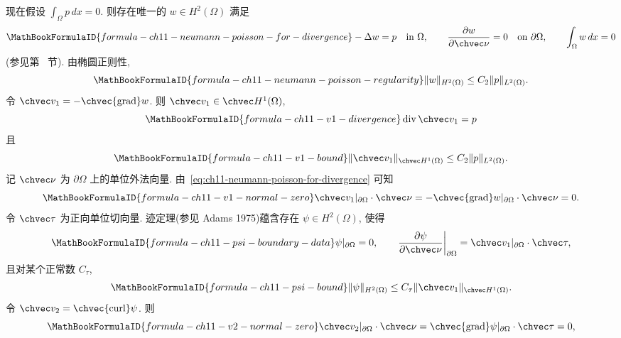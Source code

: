 \begin{Proof}
现在假设 $\int_\Omega p\,dx=0$. 则存在唯一的 $w\in H^2(\Omega)$ 满足
\begin{equation}
\MathBookFormulaID{formula-ch11-neumann-poisson-for-divergence}
\label{eq:ch11-neumann-poisson-for-divergence}
-\Delta w=p\quad\text{in }\Omega,
\qquad
\frac{\partial w}{\partial\chvec\nu}=0\quad\text{on }\partial\Omega,
\qquad
\int_\Omega w\,dx=0
\end{equation}
(参见第~ 节). 由椭圆正则性,
\[
\MathBookFormulaID{formula-ch11-neumann-poisson-regularity}
\|w\|_{H^2(\Omega)}\leq C_2\|p\|_{L^2(\Omega)}.
\]
令 $\chvec v_1=-\chvec{\operatorname{grad}}w$. 则 $\chvec v_1\in\chvec H^1(\Omega)$,
\begin{equation}
\MathBookFormulaID{formula-ch11-v1-divergence}
\label{eq:ch11-v1-divergence}
\operatorname{div}\chvec v_1=p
\end{equation}
且
\begin{equation}
\MathBookFormulaID{formula-ch11-v1-bound}
\label{eq:ch11-v1-bound}
\|\chvec v_1\|_{\chvec H^1(\Omega)}\leq C_2\|p\|_{L^2(\Omega)}.
\end{equation}
记 $\chvec\nu$ 为 $\partial\Omega$ 上的单位外法向量. 由~\eqref{eq:ch11-neumann-poisson-for-divergence} 可知
\begin{equation}
\MathBookFormulaID{formula-ch11-v1-normal-zero}
\label{eq:ch11-v1-normal-zero}
\chvec v_1|_{\partial\Omega}\cdot\chvec\nu
=-\chvec{\operatorname{grad}}w|_{\partial\Omega}\cdot\chvec\nu=0.
\end{equation}
令 $\chvec\tau$ 为正向单位切向量. 迹定理(参见 Adams 1975)蕴含存在 $\psi\in H^2(\Omega)$, 使得
\[
\MathBookFormulaID{formula-ch11-psi-boundary-data}
\psi|_{\partial\Omega}=0,
\qquad
\frac{\partial\psi}{\partial\chvec\nu}\bigg|_{\partial\Omega}
=\chvec v_1|_{\partial\Omega}\cdot\chvec\tau,
\]
且对某个正常数 $C_\tau$,
\begin{equation}
\MathBookFormulaID{formula-ch11-psi-bound}
\label{eq:ch11-psi-bound}
\|\psi\|_{H^2(\Omega)}\leq C_\tau\|\chvec v_1\|_{\chvec H^1(\Omega)}.
\end{equation}
令 $\chvec v_2=\chvec{\operatorname{curl}}\psi$. 则
\begin{equation}
\MathBookFormulaID{formula-ch11-v2-normal-zero}
\label{eq:ch11-v2-normal-zero}
\chvec v_2|_{\partial\Omega}\cdot\chvec\nu
=\chvec{\operatorname{grad}}\psi|_{\partial\Omega}\cdot\chvec\tau=0,
\end{equation}

\end{Proof}
